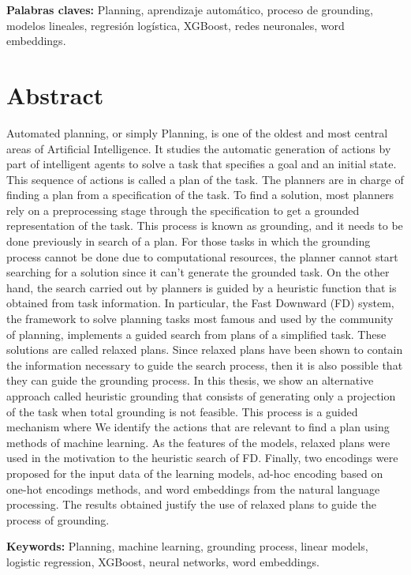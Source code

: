 \noindent %
\textbf{Palabras claves:} Planning, aprendizaje automático, proceso de
grounding, modelos lineales, regresión logística, XGBoost, redes neuronales,
word embeddings.

\section*{Abstract}

Automated planning, or simply Planning, is one of the oldest and most central
areas of Artificial Intelligence.  It studies the automatic generation of
actions by part of intelligent agents to solve a task that specifies a goal and
an initial state. This sequence of actions is called a plan of the task. The
planners are in charge of finding a plan from a specification of the task. To
find a solution, most planners rely on a  preprocessing stage through the
specification to get a grounded representation of the task. This process is
known as grounding, and it needs to be done previously in search of a plan. For
those tasks in which the grounding process cannot be done due to computational
resources, the planner cannot start searching for a solution since it can't
generate the grounded task. On the other hand, the search carried out by
planners is guided by a heuristic function that is obtained from task
information. In particular, the Fast Downward (FD) system, the framework to
solve planning tasks most famous and used by the community of planning,
implements a guided search from plans of a simplified task. These solutions are
called relaxed plans. Since relaxed plans have been shown to contain the
information necessary to guide the search process, then it is also possible that
they can guide the grounding process. In this thesis, we show an alternative
approach called heuristic grounding that consists of generating only a
projection of the task when total grounding is not feasible. This process is a
guided mechanism where We identify the actions that are relevant to find a plan
using methods of machine learning. As the features of the models, relaxed plans
were used in the motivation to the heuristic search of FD. Finally, two
encodings were proposed for the input data of the learning models, ad-hoc
encoding based on one-hot encodings methods, and word embeddings from the
natural language processing. The results obtained justify the use of relaxed
plans to guide the process of grounding.

\textbf{Keywords:} Planning, machine learning, grounding process, linear models, logistic
regression, XGBoost, neural networks, word embeddings.